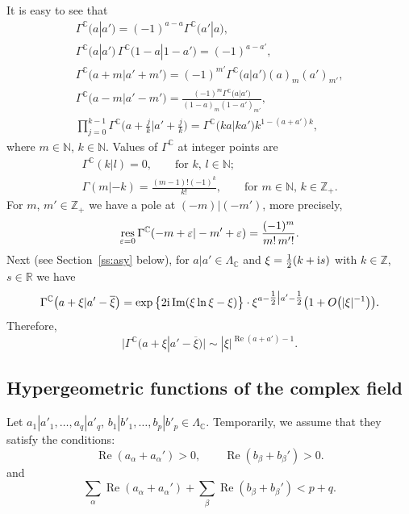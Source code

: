 \documentclass[pdftex]{sigma}
\numberwithin{equation}{section}
\renewcommand{\Re}{\mathop {\mathrm {Re}}\nolimits}
\newcommand{\res}{\mathop {\mathrm {res}}\nolimits}
\def\ov{\overline}
\renewcommand{\Re}{\mathop {\mathrm {Re}}\nolimits}
\renewcommand{\Im}{\mathop {\mathrm {Im}}\nolimits}
\def\R {{\mathbb R }}
\def\C {{\mathbb C }}
\def\Z{{\mathbb Z}}
\def\N{{\mathbb N}}
\def\epsilon{\varepsilon}
\begin{document}
It is easy to see that
\begin{subequations}
\begin{gather}
\Gamma^\C\big(a|a'\big)=(-1)^{a-a} \Gamma^\C\big(a'|a\big),\label{eq:symmetry} \\
\Gamma^\C\big(a|a'\big)\, \Gamma^\C\big(1-a|1-a'\big) =(-1)^{a-a'},\label{eq:gamma-complement} \\
\Gamma^\C\big(a+m\big|a'+m'\big) =(-1)^{m'} \Gamma^\C\big(a\big|a'\big)(a)_m(a')_{m'}, \label{eq:shift1} \\
 \Gamma^\C\big(a-m\big|a'-m'\big) =\frac{(-1)^{m} \Gamma^\C\big(a\big|a'\big)}{(1-a)_m(1-a')_{m'}}, \label{eq:shift2} \\
\prod_{j=0}^{k-1}\Gamma^\C\big(a+\tfrac jk\big|a'+\tfrac jk \big)=\Gamma^\C\big(ka\big|ka'\big)k^{1-(a+a')k},\label{eq:gamma-gauss}
\end{gather}
\end{subequations}
where $m\in\N$, $k\in\N$.
Values of $\Gamma^\C$ at integer points are
\begin{gather*}
 \Gamma^\C(k|l) = 0,\qquad \text{for $k$, $l\in\N$;} \\
 \Gamma(m|-k) =\frac{(m-1)!(-1)^k}{k!},\qquad \text{for $m\in \N$, $k\in \Z_+$}.
\end{gather*}
For $m$, $m'\in\Z_+$ we have a pole at $(-m)|(-m')$, more precisely,
\begin{equation}
\res\limits_{\epsilon=0}
\Gamma^\C(-m+\epsilon|-m'+\epsilon)=\frac{(-1)^m}{m!\, m'!}.
\label{eq:res-gamma}
\end{equation}
Next (see Section~\ref{ss:asy} below),
for $a|a'\in\Lambda_\C$ and $\xi=\frac12(k+{\rm i}s)$
with $k\in\Z$, $s\in \R$ we have
\begin{equation}
\Gamma^\C\big(a+\xi|a'-\ov \xi\big)=
\exp\big\{2{\rm i}\Im (\xi\ln \xi-\xi)\big\}\cdot \xi^{a-\tfrac12\big|a'-\tfrac12} \big(1+O\big(|\xi|^{-1}\big)\big).
\label{eq:asy1}
\end{equation}
Therefore,
\begin{equation}
\big| \Gamma^\C\big(a+\xi|a'-\ov \xi\big)\big|\sim |\xi|^{\Re(a+a')-1}.
\label{eq:asy2}
\end{equation}

\subsection{Hypergeometric functions of the complex field}\label{ss:def}
Let $a_1|a'_1,\dots, a_q|a'_q$, $b_1|b'_1,\dots,b_p|b'_p\in \Lambda_\C$.
Temporarily, we assume that they satisfy the conditions:
\begin{equation}
\Re(a_\alpha+a_\alpha')>0,\qquad \Re(b_\beta+b_\beta')>0.
\label{eq:cond1}
\end{equation}
and
\begin{equation}
\sum_\alpha \Re(a_\alpha+a_\alpha')+\sum_\beta\Re(b_\beta+b_\beta')<p+q.
 \label{eq:cond2}
\end{equation}
\end{document}
